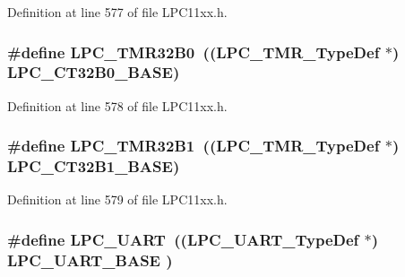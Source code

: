 Definition at line 577 of file L\+P\+C11xx.\+h.

\subsubsection[{\texorpdfstring{L\+P\+C\+\_\+\+T\+M\+R32\+B0}{LPC_TMR32B0}}]{\setlength{\rightskip}{0pt plus 5cm}\#define L\+P\+C\+\_\+\+T\+M\+R32\+B0~(({\bf L\+P\+C\+\_\+\+T\+M\+R\+\_\+\+Type\+Def}    $\ast$) {\bf L\+P\+C\+\_\+\+C\+T32\+B0\+\_\+\+B\+A\+SE})}\hypertarget{group___l_p_c11xx___definitions_ga59694d96a23b3e6de134dc5f34ad61e8}{}\label{group___l_p_c11xx___definitions_ga59694d96a23b3e6de134dc5f34ad61e8}


Definition at line 578 of file L\+P\+C11xx.\+h.

\subsubsection[{\texorpdfstring{L\+P\+C\+\_\+\+T\+M\+R32\+B1}{LPC_TMR32B1}}]{\setlength{\rightskip}{0pt plus 5cm}\#define L\+P\+C\+\_\+\+T\+M\+R32\+B1~(({\bf L\+P\+C\+\_\+\+T\+M\+R\+\_\+\+Type\+Def}    $\ast$) {\bf L\+P\+C\+\_\+\+C\+T32\+B1\+\_\+\+B\+A\+SE})}\hypertarget{group___l_p_c11xx___definitions_gab5cca8bad611399aad1da65cfafcbe2e}{}\label{group___l_p_c11xx___definitions_gab5cca8bad611399aad1da65cfafcbe2e}


Definition at line 579 of file L\+P\+C11xx.\+h.

\subsubsection[{\texorpdfstring{L\+P\+C\+\_\+\+U\+A\+RT}{LPC_UART}}]{\setlength{\rightskip}{0pt plus 5cm}\#define L\+P\+C\+\_\+\+U\+A\+RT~(({\bf L\+P\+C\+\_\+\+U\+A\+R\+T\+\_\+\+Type\+Def}   $\ast$) {\bf L\+P\+C\+\_\+\+U\+A\+R\+T\+\_\+\+B\+A\+SE}  )}\hypertarget{group___l_p_c11xx___definitions_ga31a69c06776f4a82569d7ed7e91bd45c}{}\label{group___l_p_c11xx___definitions_ga31a69c06776f4a82569d7ed7e91bd45c}



